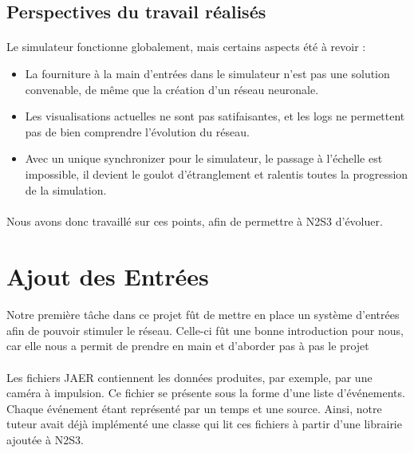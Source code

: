 \documentclass[a4paper,10pt]{article}
\begin{document}
\subsection{Perspectives du travail réalisés}
\paragraph{}
Le simulateur fonctionne globalement, mais certains aspects été à revoir :
\begin{itemize}
\item{La fourniture à la main d’entrées dans le simulateur n’est pas une solution convenable, de même que la création d’un réseau neuronale.}
\item{Les visualisations actuelles ne sont pas satifaisantes, et les logs ne permettent pas de bien comprendre l’évolution du réseau.}
\item{Avec un unique synchronizer pour le simulateur, le passage à l’échelle est impossible, il devient le goulot d’étranglement et ralentis toutes la progression de la simulation.}
\end{itemize}

\paragraph{}
Nous avons donc travaillé sur ces points, afin de permettre à N2S3 d’évoluer.

\newpage

\section{Ajout des Entrées}

\paragraph{}
Notre première tâche dans ce projet fût de mettre en place un système d'entrées afin de pouvoir stimuler le réseau. Celle-ci fût une bonne introduction pour nous, car elle nous a permit de prendre en main et d’aborder pas à pas le projet

\paragraph{}
Les fichiers JAER contiennent les données produites, par exemple, par une caméra à impulsion. Ce fichier se présente sous la forme d’une liste d’événements. Chaque événement étant représenté par un temps et une source. Ainsi, notre tuteur avait déjà implémenté une classe qui lit ces fichiers à partir d’une librairie ajoutée à N2S3. 
\end{document}
